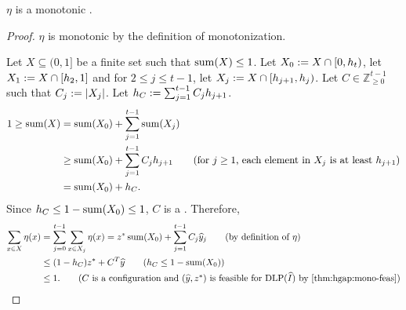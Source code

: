 \begin{lemma}
\label{thm:hgap:eta-dff}
$\eta$ is a monotonic \dff{}.
\end{lemma}
\begin{proof}
$\eta$ is monotonic by the definition of monotonization.

Let $X \subseteq (0, 1]$ be a finite set such that $\operatorname{sum}(X) \le 1$.
Let $X_0 := X \cap [0, h_t)$,
let $X_1 := X \cap [h_2, 1]$
and for $2 \le j \le t-1$, let $X_j := X \cap [h_{j+1}, h_j)$.
Let $C \in \mathbb{Z}^{t-1}_{\ge 0}$ such that $C_j := |X_j|$.
Let $h_C := \sum_{j=1}^{t-1} C_jh_{j+1}$.
\begin{align*}
1 \ge \Sum(X) &= \Sum(X_0) + \sum_{j=1}^{t-1} \Sum(X_j)
\\ &\ge \Sum(X_0) + \sum_{j=1}^{t-1} C_jh_{j+1}
\tag{for $j \ge 1$, each element in $X_j$ is at least $h_{j+1}$}
\\ &= \Sum(X_0) + h_C.
\end{align*}
Since $h_C \le 1 - \operatorname{sum}(X_0) \le 1$, $C$ is a \config{}. Therefore,
\begin{align*}
\sum_{x \in X} \eta(x)
&= \sum_{j=0}^{t-1} \sum_{x \in X_j} \eta(x)
= z^*\Sum(X_0) + \sum_{j=1}^{t-1} C_j\yhat_j
\tag{by definition of $\eta$}
\\ &\le (1-h_C)z^* + C^T\yhat
\tag{$h_C \le 1 - \Sum(X_0)$}
\\ &\le 1.
\tag{$C$ is a \config{} and $(\yhat, z^*)$ is feasible for $\DLP(\Ihat)$
    by \thmdepcref{thm:hgap:mono-feas}{}}
\end{align*}
\end{proof}

